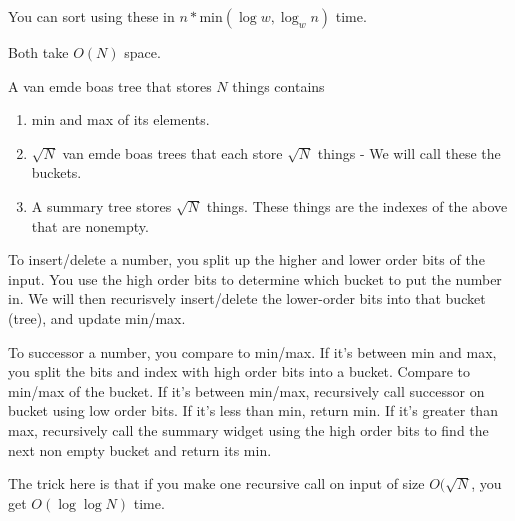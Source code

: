 \documentclass[7pt,twocolumn]{article}
\begin{document}
You can sort using these in $n * $min$(\log w, \log_{w}{n})$ time.

Both take $O(N)$ space.

A van emde boas tree that stores $N$ things contains
\begin{enumerate}
    \item min and max of its elements.
    \item $\sqrt{N}$ van emde boas trees that each store $\sqrt{N}$ things - We will call these the buckets.
    \item A summary tree stores $\sqrt{N}$ things. These things are the indexes of the above that are nonempty.
\end{enumerate}

To insert/delete a number, you split up the higher and lower order bits of the input. You use the high order bits to determine which bucket to put the number in. We will then recurisvely insert/delete the lower-order bits into that bucket (tree), and update min/max.

To successor a number, you compare to min/max. If it's between min and max, you split the bits and index with high order bits into a bucket. Compare to min/max of the bucket. If it's between min/max, recursively call successor on bucket using low order bits. If it's less than min, return min. If it's greater than max, recursively call the summary widget using the high order bits to find the next non empty bucket and return its min.

The trick here is that if you make one recursive call on input of size $O(\sqrt{N}$, you get $O(\log \log N)$ time.

\end{document}
